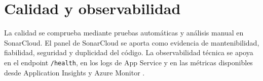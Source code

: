 \section{Calidad y observabilidad}

La calidad se comprueba mediante pruebas automáticas y análisis manual en SonarCloud. El panel de SonarCloud se aporta como evidencia de mantenibilidad, fiabilidad, seguridad y duplicidad del código. La observabilidad técnica se apoya en el endpoint \texttt{/health}, en los logs de App Service y en las métricas disponibles desde Application Insights y Azure Monitor \cite{azure_monitor}.
